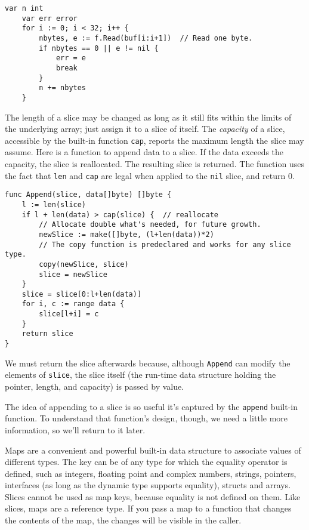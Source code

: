 \begin{Verbatim}[frame=single]
    var n int
    var err error
    for i := 0; i < 32; i++ {
        nbytes, e := f.Read(buf[i:i+1])  // Read one byte.
        if nbytes == 0 || e != nil {
            err = e
            break
        }
        n += nbytes
    }
\end{Verbatim}

The length of a slice may be changed as long as it still fits within the
limits of the underlying array; just assign it to a slice of itself. The
\emph{capacity} of a slice, accessible by the built-in function
\texttt{cap}, reports the maximum length the slice may assume. Here is a
function to append data to a slice. If the data exceeds the capacity,
the slice is reallocated. The resulting slice is returned. The function
uses the fact that \texttt{len} and \texttt{cap} are legal when applied
to the \texttt{nil} slice, and return 0.

\begin{Verbatim}[frame=single]
func Append(slice, data[]byte) []byte {
    l := len(slice)
    if l + len(data) > cap(slice) {  // reallocate
        // Allocate double what's needed, for future growth.
        newSlice := make([]byte, (l+len(data))*2)
        // The copy function is predeclared and works for any slice type.
        copy(newSlice, slice)
        slice = newSlice
    }
    slice = slice[0:l+len(data)]
    for i, c := range data {
        slice[l+i] = c
    }
    return slice
}
\end{Verbatim}

We must return the slice afterwards because, although \texttt{Append}
can modify the elements of \texttt{slice}, the slice itself (the
run-time data structure holding the pointer, length, and capacity) is
passed by value.

The idea of appending to a slice is so useful it's captured by the
\texttt{append} built-in function. To understand that function's design,
though, we need a little more information, so we'll return to it later.


Maps are a convenient and powerful built-in data structure to associate
values of different types. The key can be of any type for which the
equality operator is defined, such as integers, floating point and
complex numbers, strings, pointers, interfaces (as long as the dynamic
type supports equality), structs and arrays. Slices cannot be used as
map keys, because equality is not defined on them. Like slices, maps are
a reference type. If you pass a map to a function that changes the
contents of the map, the changes will be visible in the caller.


